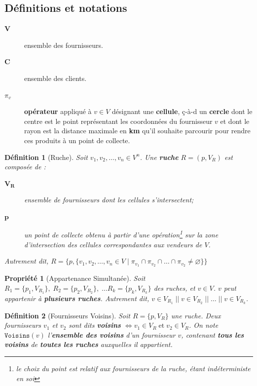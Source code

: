 \documentclass[a4paper,12pt]{report}
\theoremstyle{break}
\theoremstyle{break}
\newtheorem*{definition}{Définition}
\theoremstyle{break}
\newtheorem*{property}{Propriété}
\theoremstyle{break}
\theoremstyle{definition}
\theoremstyle{remark}
\begin{document}
\subsection{Définitions et notations}
\begin{description}
  \item[$\textbf{V}$]{ensemble des fournisseurs.}
  \item[$\textbf{C}$]{ensemble des clients.}
  \item[$\pi_v$]{\textbf{opérateur} appliqué à $v \in V$ désignant une \textbf{cellule}, ç-à-d un \textbf{cercle} dont le centre est le point représentant les coordonnées du fournisseur $v$ et dont le rayon est la distance maximale en \textbf{km} qu'il souhaite parcourir pour rendre ces produits à un point de collecte.}
\end{description}

\begin{definition}[Ruche]
Soit $v_1, v_2, \dots, v_n \in V^n$. Une \textbf{ruche} $R = (p, V_R)$ est composée de :
\begin{description}
  \item[$\mathbf{V_R}$]{ensemble de fournisseurs dont les cellules s'intersectent;}
  \item[$\mathbf{p}$]{un point de collecte obtenu à partir d'une opération\footnote{le choix du point est relatif aux fournisseurs de la ruche, étant indéterministe en soi} sur la zone d'intersection des cellules correspondantes aux vendeurs de $V$.}
\end{description}
Autrement dit, $R = \{p, \{v_1, v_2, \dots, v_n \in V\; |\; \pi_{v_1} \cap \pi_{v_2} \cap \dots \cap \pi_{v_2} \neq \varnothing\}\}$
\end{definition}

\begin{property}[Appartenance Simultanée]
Soit $R_1 = \{p_1, V_{R_1}\},\; R_2 = \{p_2, V_{R_2}\},\; \dots R_k = \{p_k, V_{R_k}\}$ des ruches, et $v \in V$. $v$ peut appartenir à \textbf{plusieurs ruches}. Autrement dit, $v \in V_{R_1}\; ||\; v \in V_{R_2}\; ||\; \dots\; ||\; v \in V_{R_k}$.
\end{property}

\begin{definition}[Fournisseurs Voisins]
Soit $R = \{p, V_R\}$ une ruche. Deux fournisseurs $v_1$ et $v_2$ sont dits \textbf{voisins} $\iff v_1 \in V_R\; \text{et}\; v_2 \in V_R$. On note $\texttt{Voisins}(v)$ l'\textbf{ensemble des voisins} d'un fournisseur $v$, contenant \textbf{tous les voisins} de \textbf{toutes les ruches} auxquelles il appartient.
\end{definition}
\end{document}
